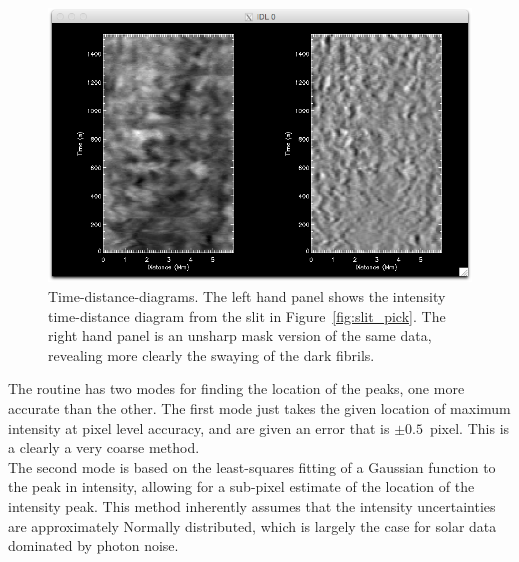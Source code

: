 \documentclass{article}
\begin{document}
\begin{figure}[!tp]

\centering

\includegraphics[scale=0.6, clip=true, viewport=0.5cm 0.cm 29.cm 16.7cm]{slit_example.png}  

\caption{Time-distance-diagrams. The left hand panel shows the intensity time-distance diagram from the slit in Figure~\ref{fig:slit_pick}. The right hand panel is an unsharp mask version of the same data, revealing more clearly the swaying of the dark fibrils.
}\label{fig:slit_pick2}

\end{figure}

\smallskip
The routine has two modes for finding the location of the peaks, one more accurate than the other. The first mode just takes the given location of maximum intensity at pixel level accuracy, and are given an error that is $\pm0.5$~pixel. This is a clearly a very coarse method.\\

 The second mode is based on the least-squares fitting of a Gaussian function to the peak in intensity, allowing for a sub-pixel estimate of the location of the intensity peak. This method inherently assumes that the intensity uncertainties are approximately Normally distributed, which is largely the case for solar data dominated by photon noise. \\
\end{document}
